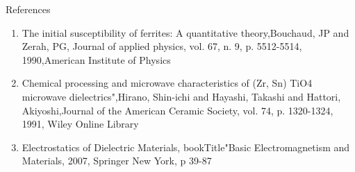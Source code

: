 \documentclass[11pt,aspect ratio=169]{beamer}
\begin{document}
\begin{frame}[allowframebreaks]{References}
\begin{enumerate}
\item The initial susceptibility of ferrites: A quantitative theory,Bouchaud, JP and Zerah, PG, Journal of applied physics,
	vol. 67,
	n. 9,
	p. 5512-5514,
	1990,American Institute of Physics

\item 
Chemical processing and microwave characteristics of (Zr, Sn) TiO4 microwave dielectrics",Hirano, Shin-ichi and Hayashi, Takashi and Hattori, Akiyoshi,Journal of the American Ceramic Society,
	vol. 74,
	p. 1320-1324,
	1991,
	Wiley Online Library
	
\item Electrostatics of Dielectric Materials,
	bookTitle"Basic Electromagnetism and Materials,
	2007,
	Springer New York,
p 39-87
\end{enumerate}
\end{frame}
\end{document}
